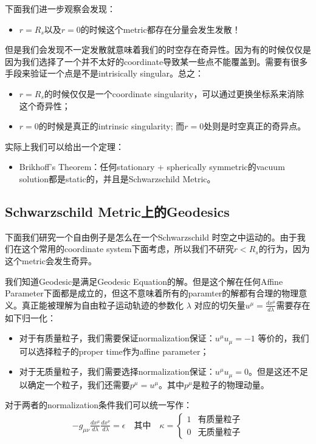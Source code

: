 \bigskip
{}

下面我们进一步观察会发现：
\begin{itemize}
  \item $ r = R_s $以及$ r = 0 $的时候这个metric都存在分量会发生发散！
\end{itemize}
但是我们会发现不一定发散就意味着我们的时空存在奇异性。因为有的时候仅仅是因为我们选择了一个并不太好的coordinate导致某一些点不能覆盖到。需要有很多手段来验证一个点是不是intrisically
singular。总之：
\begin{itemize}
  \item $ r = R_s $的时候仅仅是一个coordinate singularity，可以通过更换坐标系来消除这个奇异性；
  \item $ r = 0 $的时候是真正的intrinsic singularity; 而$ r = 0 $处则是时空真正的奇异点。
\end{itemize}

\bigskip
{}

实际上我们可以给出一个定理：
\begin{itemize}
  \item Brikhoff's Theorem：任何stationary + spherically
    symmetric的vacuum solution都是static的，并且是Schwarzschild Metric。
\end{itemize}

\subsection{Schwarzschild Metric上的Geodesics}

下面我们研究一个自由例子是怎么在一个Schwarzschild 时空之中运动的。由于我们在这个常用的coordinate
system下面考虑，所以我们不研究$ r < R_s $的行为，因为这个metric会发生奇异。

\bigskip
{}

我们知道Geodesic是满足Geodesic Equation的解。但是这个解在任何Affine
Parameter下面都是成立的，但这不意味着所有的paramter的解都有合理的物理意义。真正能被理解为自由粒子运动轨迹的参数化 $
\lambda $ 对应的切矢量$ u^\mu = \frac{d x^\mu}{d \lambda} $需要存在如下归一化：
\begin{itemize}
  \item 对于有质量粒子，我们需要保证normalization保证：$ u^\mu u_\mu = -1 $
    等价的，我们可以选择粒子的proper time作为affine parameter；
  \item 对于无质量粒子，我们需要选择normalization保证：$ u^\mu u_\mu = 0
    $。但是这还不足以确定一个粒子，我们还需要$ p^\mu = u^\mu $。其中$ p^\mu $是粒子的物理动量。
\end{itemize}
对于两者的normalization条件我们可以统一写作：
\begin{align}\label{eq:normalization}
  -g_{\mu\nu} \frac{d x^\mu}{d \lambda} \frac{d x^\nu}{d \lambda} =
  \epsilon \quad \text{其中} \quad \kappa =
  \begin{cases}
    1 & \text{有质量粒子} \\
    0 & \text{无质量粒子}
  \end{cases}
\end{align}

